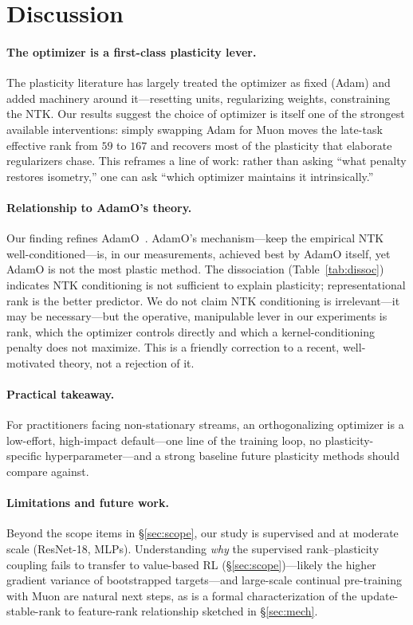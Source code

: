 \documentclass[letterpaper]{article} %
\begin{document}
\section{Discussion}
\paragraph{The optimizer is a first-class plasticity lever.} The plasticity literature has largely treated the optimizer as fixed (Adam) and added machinery around it---resetting units, regularizing weights, constraining the NTK. Our results suggest the choice of optimizer is itself one of the strongest available interventions: simply swapping Adam for Muon moves the late-task effective rank from $59$ to $167$ and recovers most of the plasticity that elaborate regularizers chase. This reframes a line of work: rather than asking ``what penalty restores isometry,'' one can ask ``which optimizer maintains it intrinsically.''
\paragraph{Relationship to AdamO's theory.} Our finding refines AdamO~\citep{adamo2026}. AdamO's mechanism---keep the empirical NTK well-conditioned---is, in our measurements, achieved best by AdamO itself, yet AdamO is not the most plastic method. The dissociation (Table~\ref{tab:dissoc}) indicates NTK conditioning is not sufficient to explain plasticity; representational rank is the better predictor. We do not claim NTK conditioning is irrelevant---it may be necessary---but the operative, manipulable lever in our experiments is rank, which the optimizer controls directly and which a kernel-conditioning penalty does not maximize. This is a friendly correction to a recent, well-motivated theory, not a rejection of it.
\paragraph{Practical takeaway.} For practitioners facing non-stationary streams, an orthogonalizing optimizer is a low-effort, high-impact default---one line of the training loop, no plasticity-specific hyperparameter---and a strong baseline future plasticity methods should compare against.
\paragraph{Limitations and future work.} Beyond the scope items in \S\ref{sec:scope}, our study is supervised and at moderate scale (ResNet-18, MLPs). Understanding \emph{why} the supervised rank--plasticity coupling fails to transfer to value-based RL (\S\ref{sec:scope})---likely the higher gradient variance of bootstrapped targets---and large-scale continual pre-training with Muon are natural next steps, as is a formal characterization of the update-stable-rank to feature-rank relationship sketched in \S\ref{sec:mech}.
\end{document}
